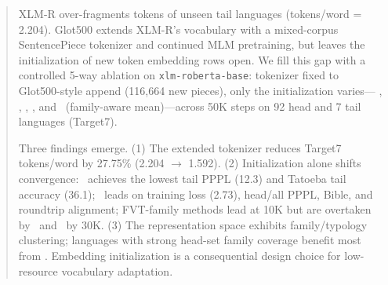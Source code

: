 \begin{abstract}
\noindent
XLM-R over-fragments tokens of unseen tail languages (tokens/word = 2.204).
Glot500 extends XLM-R's vocabulary with a mixed-corpus SentencePiece tokenizer and
continued MLM pretraining, but leaves the initialization of new token embedding rows open.
We fill this gap with a controlled 5-way ablation on \texttt{xlm-roberta-base}:
tokenizer fixed to Glot500-style append (116,664 new pieces), only the initialization varies---
\rand, \meanm, \fvt, \wfvt, and \famm\ (family-aware mean)---across 50K steps on
92 head and 7 tail languages (Target7).

Three findings emerge.
(1) The extended tokenizer reduces Target7 tokens/word by 27.75\% (2.204 $\to$ 1.592).
(2) Initialization alone shifts convergence: \famm\ achieves the lowest tail PPPL (12.3) and
Tatoeba tail accuracy (36.1); \wfvt\ leads on training loss (2.73), head/all PPPL, Bible, and
roundtrip alignment; FVT-family methods lead at 10K but are overtaken by \wfvt\ and \famm\ by 30K.
(3) The representation space exhibits family/typology clustering; languages with strong head-set
family coverage benefit most from \famm.
Embedding initialization is a consequential design choice for low-resource vocabulary adaptation.
\end{abstract}

